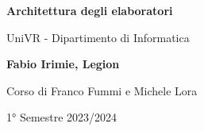 \begin{titlepage}
	\begin{center}
		\vspace*{1cm}

		\Huge
		\textbf{Architettura degli elaboratori}

		\vspace{0.5cm}
		\LARGE
		UniVR - Dipartimento di Informatica

		\vspace{1.5cm}

		\textbf{Fabio Irimie, Legion}

		\vfill


		\vspace{0.8cm}

    Corso di Franco Fummi e Michele Lora

		1° Semestre 2023/2024

	\end{center}
\end{titlepage}
